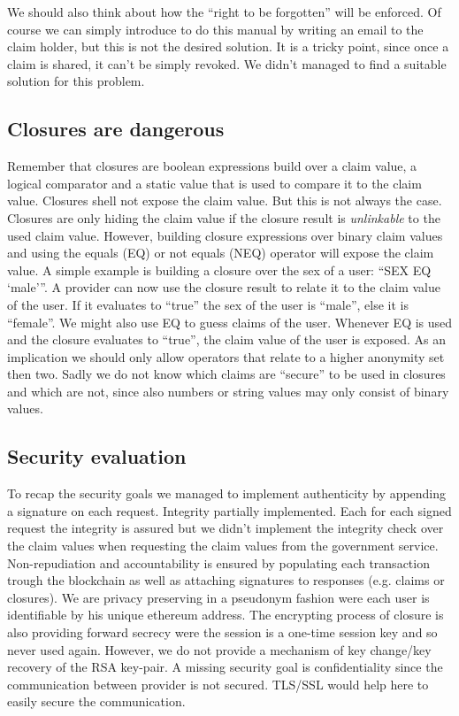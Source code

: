 We should also think about how the “right to be forgotten” will be enforced. Of course we can simply introduce to do this manual by writing an email to the claim holder, but this is not the desired solution. It is a tricky point, since once a claim is shared, it can’t be simply revoked. We didn’t managed to find a suitable solution for this problem.  

\subsection{Closures are dangerous}
Remember that closures are boolean expressions build over a claim value, a logical comparator and a static value that is used to compare it to the claim value. Closures shell not expose the claim value. But this is not always the case. Closures are only hiding the claim value if the closure result is \textit{unlinkable} to the used claim value. However, building closure expressions over binary claim values and using the equals (EQ) or not equals (NEQ) operator will expose the claim value. A simple example is building a closure over the sex of a user: “SEX EQ ‘male’”. A provider can now use the closure result to relate it to the claim value of the user. If it evaluates to “true” the sex of the user is “male”, else it is “female”. We might also use EQ to guess claims of the user. Whenever EQ is used and the closure evaluates to “true”, the claim value of the user is exposed. As an implication we should only allow operators that relate to a higher anonymity set then two. Sadly we do not know which claims are “secure” to be used in closures and which are not, since also numbers or string values may only consist of binary values. 

\subsection{Security evaluation}
\label{sec:securityEvaluation}
To recap the security goals we managed to implement authenticity by appending a signature on each request. Integrity partially implemented. Each for each signed request the integrity is assured but we didn’t implement the integrity check over the claim values when requesting the claim values from the government service. Non-repudiation and accountability is ensured by populating each transaction trough the blockchain as well as attaching signatures to responses (e.g. claims or closures). We are privacy preserving in a pseudonym fashion were each user is identifiable by his unique ethereum address. The encrypting process of closure is also providing forward secrecy were the session is a one-time session key and so never used again. However, we do not provide a mechanism of key change/key recovery of the RSA key-pair. A missing security goal is confidentiality since the communication between provider is not secured. TLS/SSL would help here to easily secure the communication. 

